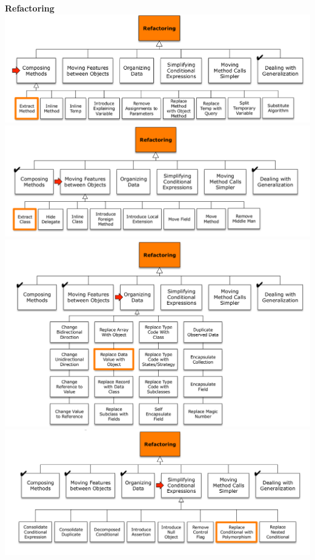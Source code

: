 \textbf{Refactoring}\\
\includegraphics[width=\linewidth]{images/refactoring_composing_methods.png}
\includegraphics[width=\linewidth]{images/refactoring_moving_features.png}
\includegraphics[width=\linewidth]{images/refactoring_organizing_data.png}
\includegraphics[width=\linewidth]{images/refactoring_conditional_expressions.png}
